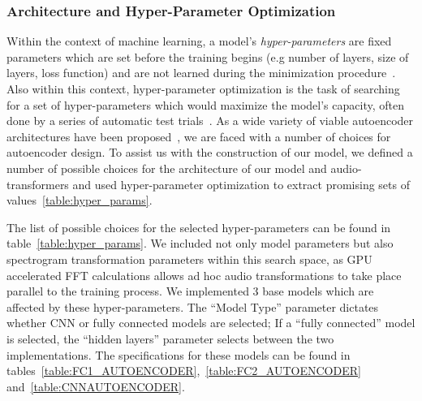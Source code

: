 \documentclass[\main/thesis.tex]{subfiles}
\begin{document}
\subsubsection{Architecture and Hyper-Parameter Optimization}

Within the context of machine learning, a model's \emph{hyper-parameters} are fixed parameters which are set before the training begins (e.g number of layers, size of layers, loss function) and are not learned during the minimization procedure~\cite{bengio2000gradient}. Also within this context, hyper-parameter optimization is the task of searching for a set of hyper-parameters which would maximize the model's capacity, often done by a series of automatic test trials~\cite{bengio2000gradient,bergstra2011algorithms,bergstra2012random}. As a wide variety of viable autoencoder architectures have been proposed~\cite{aouameur2019neural,esling2018generative,gensler2016deep,zhang2016facing,pu2016variational}, we are faced with a number of choices for autoencoder design. To assist us with the construction of our model, we defined a number of possible choices for the architecture of our model and audio-transformers and used hyper-parameter optimization to extract promising sets of values~\ref{table:hyper_params}. 

The list of possible choices for the selected hyper-parameters can be found in table~\ref{table:hyper_params}. We included not only model parameters but also spectrogram transformation parameters within this search space, as GPU accelerated FFT calculations allows ad hoc audio transformations to take place parallel to the training process. We implemented 3 base models which are affected by these hyper-parameters. The \enquote{Model Type} parameter dictates whether CNN or fully connected models are selected; If a \enquote{fully connected} model is selected, the \enquote{hidden layers} parameter selects between the two implementations. The specifications for these models can be found in tables~\ref{table:FC1_AUTOENCODER},~\ref{table:FC2_AUTOENCODER} and~\ref{table:CNNAUTOENCODER}.
\end{document}
